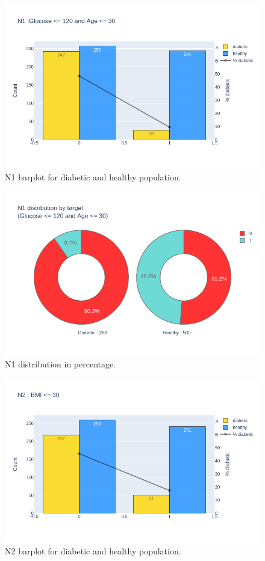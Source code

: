 \documentclass[12pt]{article}
\begin{document}
\begin{figure}[ht]
\centering
\includegraphics[width=1\textwidth]{newplot(13).png}
\caption{\label{fig:23} N1 barplot for diabetic and healthy population.}
\end{figure}

\begin{figure}[ht]
\centering
\includegraphics[width=1\textwidth]{newplot(14).png}
\caption{\label{fig:24} N1 distribution in percentage.}
\end{figure}

\begin{figure}[ht]
\centering
\includegraphics[width=1\textwidth]{newplot(15).png}
\caption{\label{fig:25} N2 barplot for diabetic and healthy population.}
\end{figure}
\end{document}

